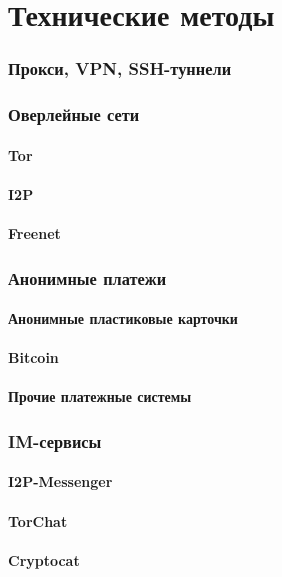\part{Технические методы}
\section{Прокси, VPN, SSH-туннели}

\section{Оверлейные сети}
\subsection{Tor}
\subsection{I2P}
\subsection{Freenet}

\section{Анонимные платежи}
\subsection{Анонимные пластиковые карточки}
\subsection{Bitcoin}
\subsection{Прочие платежные системы}

\section{IM-сервисы}
\subsection{I2P-Messenger}
\subsection{TorChat}
\subsection{Cryptocat}

